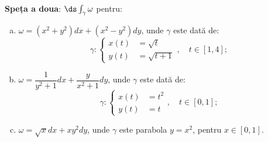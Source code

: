 \textbf{Speța a doua}: $ \ds\int_\gamma \omega $ pentru:

\begin{enumerate}[(a)]
\item $ \omega = (x^2 + y^2) dx + (x^2 - y^2) dy $, unde $ \gamma $ este
  dată de:
  \[
    \gamma: %
    \begin{cases}
      x(t) &= \sqrt{t} \\
      y(t) &= \sqrt{t + 1}
    \end{cases}, \quad t \in [1, 4];
  \]
\item $ \omega = \dfrac{1}{y^2 + 1} dx + \dfrac{y}{x^2 + 1} dy $, unde
  $ \gamma $ este dată de:
  \[
    \gamma: %
    \begin{cases}
      x(t) &= t^2 \\
      y(t) &= t
    \end{cases}, \quad t \in [0, 1];
  \]
\item $ \omega = \sqrt{x} dx + xy^2 dy $, unde $ \gamma $ este
  parabola $ y = x^2 $, pentru $ x \in [0, 1] $.
\end{enumerate}


